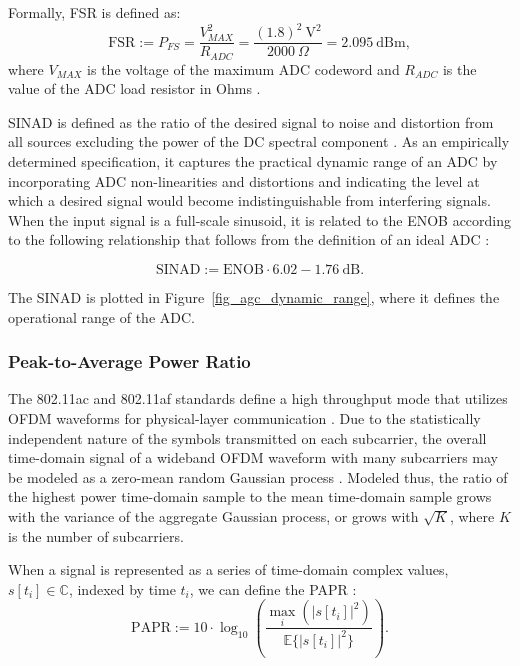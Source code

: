 Formally, \ac{FSR} is defined as:
\begin{equation} \label{eq_fsp}
\text{FSR} := P_{FS} = \frac{V_{MAX}^2}{R_{ADC}} = \frac{(1.8)^2~\text{V}^2}{2000~\Omega} = 2.095~\text{dBm},
\end{equation}
where $V_{MAX}$ is the voltage of the maximum ADC codeword and $R_{ADC}$ is the value of the ADC load resistor in Ohms \cite{lime2012lms6002d}.

\ac{SINAD} is defined as the ratio of the desired signal to noise and distortion from all sources excluding the power of the DC spectral component \cite{adi2008sinad}.
As an empirically determined specification, it captures the practical dynamic range of an ADC by incorporating ADC non-linearities and distortions and indicating the level at which a desired signal would become indistinguishable from interfering signals.
When the input signal is a full-scale sinusoid, it is related to the \ac{ENOB} according to the following relationship that follows from the definition of an ideal ADC \cite{rohde2011enob}:

\begin{equation} \label{eq_enob}
\text{SINAD} := \text{ENOB} \cdot 6.02 - 1.76~\text{dB}.
\end{equation}

The \ac{SINAD} is plotted in Figure~\ref{fig_agc_dynamic_range}, where it defines the operational range of the \ac{ADC}.

\subsubsection{Peak-to-Average Power Ratio}
\label{sec_agc_papr}

The 802.11ac and 802.11af standards define a high throughput mode that utilizes \ac{OFDM} waveforms for physical-layer communication \cite{perahia2013next, flores2013ieee80211af}.
Due to the statistically independent nature of the symbols transmitted on each subcarrier, the overall time-domain signal of a wideband \ac{OFDM} waveform with many subcarriers may be modeled as a zero-mean random Gaussian process \cite{proakis1995digital}.
Modeled thus, the ratio of the highest power time-domain sample to the mean time-domain sample grows with the variance of the aggregate Gaussian process, or grows with $\sqrt{K}$, where $K$ is the number of subcarriers.

When a signal is represented as a series of time-domain complex values, $s[t_i]\in \mathbb{C}$, indexed by time $t_i$, we can define the \ac{PAPR} \cite{bauml1996reducing}: 
\begin{equation}
\text{PAPR} := 10 \cdot\log_{10}(\frac{\max_{i}(|s[t_i]|^2)}{\mathbb{E}\{|s[t_i]|^2\}}).
\end{equation}

